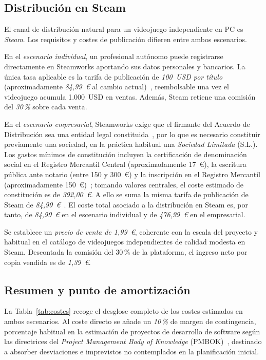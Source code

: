 \subsection{Distribución en Steam}

El canal de distribución natural para un videojuego independiente en PC es \textit{Steam}. Los requisitos y costes de publicación difieren entre ambos escenarios.

En el \textit{escenario individual}, un profesional autónomo puede registrarse directamente en Steamworks aportando sus datos personales y bancarios. La única tasa aplicable es la tarifa de publicación de \textit{100~USD por título} (aproximadamente \textit{84,99~€} al cambio actual)~\cite{steam_pricing}, reembolsable una vez el videojuego acumula 1.000~USD en ventas. Además, Steam retiene una comisión del \textit{30\,\%} sobre cada venta.

En el \textit{escenario empresarial}, Steamworks exige que el firmante del Acuerdo de Distribución sea una entidad legal constituida~\cite{steam_onboarding}, por lo que es necesario constituir previamente una sociedad, en la práctica habitual una \textit{Sociedad Limitada} (S.L.). Los gastos mínimos de constitución incluyen la certificación de denominación social en el Registro Mercantil Central (aproximadamente 17~€), la escritura pública ante notario (entre 150 y 300~€) y la inscripción en el Registro Mercantil (aproximadamente 150~€)~\cite{quipu_sl, abogados_mercantiles_sl}; tomando valores centrales, el coste estimado de constitución es de \textit{392,00~€}. A ello se suma la misma tarifa de publicación de Steam de \textit{84,99~€}~\cite{steam_pricing}. El coste total asociado a la distribución en Steam es, por tanto, de \textit{84,99~€} en el escenario individual y de \textit{476,99~€} en el empresarial.

Se establece un \textit{precio de venta de 1,99~€}, coherente con la escala del proyecto y habitual en el catálogo de videojuegos independientes de calidad modesta en Steam. Descontada la comisión del 30\,\% de la plataforma, el ingreso neto por copia vendida es de \textit{1,39~€}.

\subsection{Resumen y punto de amortización}

La Tabla~\ref{tab:costes} recoge el desglose completo de los costes estimados en ambos escenarios. Al coste directo se añade un \textit{10\,\%} de margen de contingencia, porcentaje habitual en la estimación de proyectos de desarrollo de software según las directrices del \textit{Project Management Body of Knowledge} (PMBOK)~\cite{pmi_contingency}, destinado a absorber desviaciones e imprevistos no contemplados en la planificación inicial.

